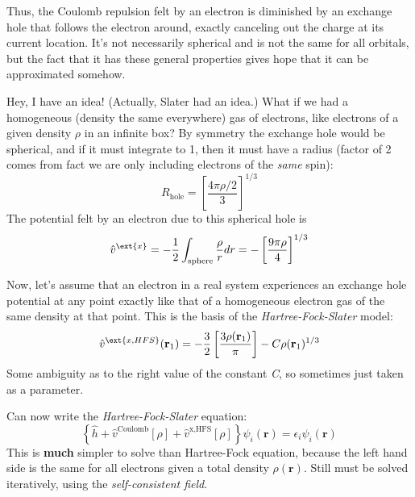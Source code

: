 \documentclass[11pt]{article}
\begin{document}
Thus, the Coulomb repulsion felt by an electron is diminished by an exchange hole that
follows the electron around, exactly canceling out the charge at its current location.
It’s not necessarily spherical and is not the same for all orbitals, but the fact that it
has these general properties gives hope that it can be approximated somehow.

Hey, I have an idea!  (Actually, Slater had an idea.) What if we had a homogeneous (density the same everywhere) gas of electrons, like electrons of a given density \(\rho\) in an infinite box?  By symmetry the exchange hole would be spherical, and if it must integrate to 1, then it must have a radius (factor of 2 comes from fact we are only including electrons of the \emph{same} spin):
\[R_\text{hole} = \left [\frac{4\pi\rho/2}{3} \right ]^{1/3} \]
The potential felt by an electron due to this spherical hole is
\[\hat{v}^\ext{x} = -\frac{1}{2}\int_\text{sphere}\frac{\rho}{r}dr = - \left [\frac{9\pi\rho}{4}\right ]^{1/3} \]

Now, let's assume that an electron in a real system experiences an exchange hole potential at any point exactly like that of a homogeneous electron gas of the same density at that point.  This is the basis of the \emph{Hartree-Fock-Slater} model:
\[\hat{v}^\ext{x,HFS}(\mathbf{r}_1) =-\frac{3}{2}\left[\frac{3\rho(\mathbf{r}_1)}{\pi} \right] -C\rho(\mathbf{r}_1)^{1/3} \]
Some ambiguity as to the right value of the constant \emph{C}, so sometimes just taken as a parameter.

Can now write the \emph{Hartree-Fock-Slater} equation:
\[ \left\{ \hat{h} + \hat{v}^\text{Coulomb}[\rho] + \hat{v}^\text{x,HFS}[\rho]\right \} \psi_i(\mathbf{r}) = \epsilon_i\psi_i(\mathbf{r}) \]
This is \textbf{much} simpler to solve than Hartree-Fock equation, because the left hand side is the same for all electrons given a total density \(\rho(\mathbf{r})\). Still must be solved iteratively, using the \emph{self-consistent field}.
\end{document}
